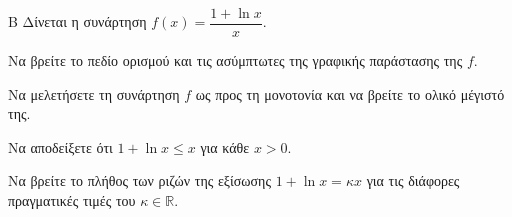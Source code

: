 \begin{thema}{Β}
Δίνεται η συνάρτηση $f(x) = \dfrac{1+\ln x}{x}$.
\begin{erwthma}
\item Να βρείτε το πεδίο ορισμού και τις ασύμπτωτες της γραφικής παράστασης της $f$.
\item Να μελετήσετε τη συνάρτηση $f$ ως προς τη μονοτονία και να βρείτε το ολικό μέγιστό της.
\item Να αποδείξετε ότι $1+\ln x \le x$ για κάθε $x > 0$.
\item Να βρείτε το πλήθος των ριζών της εξίσωσης $1 + \ln x = \kappa x$ για τις διάφορες πραγματικές τιμές του $\kappa \in \mathbb{R}$.
\end{erwthma}
\end{thema}

